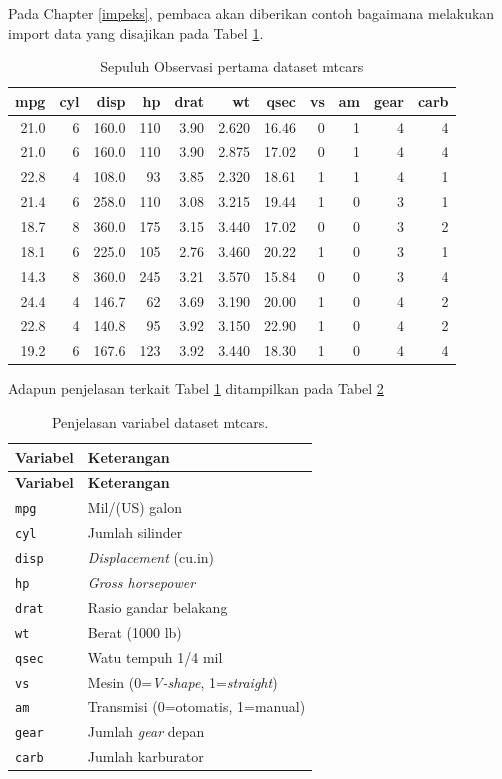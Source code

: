 \documentclass[12pt,]{krantz}
\begin{document}
Pada Chapter \ref{impeks}, pembaca akan diberikan contoh bagaimana melakukan import data yang disajikan pada Tabel \ref{tab:mtcars}.

\begin{table}

\caption{\label{tab:mtcars}Sepuluh Observasi pertama dataset mtcars}
\centering
\begin{tabular}[t]{r|r|r|r|r|r|r|r|r|r|r}
\hline
mpg & cyl & disp & hp & drat & wt & qsec & vs & am & gear & carb\\
\hline
21.0 & 6 & 160.0 & 110 & 3.90 & 2.620 & 16.46 & 0 & 1 & 4 & 4\\
\hline
21.0 & 6 & 160.0 & 110 & 3.90 & 2.875 & 17.02 & 0 & 1 & 4 & 4\\
\hline
22.8 & 4 & 108.0 & 93 & 3.85 & 2.320 & 18.61 & 1 & 1 & 4 & 1\\
\hline
21.4 & 6 & 258.0 & 110 & 3.08 & 3.215 & 19.44 & 1 & 0 & 3 & 1\\
\hline
18.7 & 8 & 360.0 & 175 & 3.15 & 3.440 & 17.02 & 0 & 0 & 3 & 2\\
\hline
18.1 & 6 & 225.0 & 105 & 2.76 & 3.460 & 20.22 & 1 & 0 & 3 & 1\\
\hline
14.3 & 8 & 360.0 & 245 & 3.21 & 3.570 & 15.84 & 0 & 0 & 3 & 4\\
\hline
24.4 & 4 & 146.7 & 62 & 3.69 & 3.190 & 20.00 & 1 & 0 & 4 & 2\\
\hline
22.8 & 4 & 140.8 & 95 & 3.92 & 3.150 & 22.90 & 1 & 0 & 4 & 2\\
\hline
19.2 & 6 & 167.6 & 123 & 3.92 & 3.440 & 18.30 & 1 & 0 & 4 & 4\\
\hline
\end{tabular}
\end{table}

Adapun penjelasan terkait Tabel \ref{tab:mtcars} ditampilkan pada Tabel \ref{tab:mtcars2}

\begin{longtable}[]{@{}ll@{}}
\caption{\label{tab:mtcars2} Penjelasan variabel dataset mtcars.}\tabularnewline
\toprule
\textbf{Variabel} & \textbf{Keterangan}\tabularnewline
\midrule
\endfirsthead
\toprule
\textbf{Variabel} & \textbf{Keterangan}\tabularnewline
\midrule
\endhead
\texttt{mpg} & Mil/(US) galon\tabularnewline
\texttt{cyl} & Jumlah silinder\tabularnewline
\texttt{disp} & \emph{Displacement} (cu.in)\tabularnewline
\texttt{hp} & \emph{Gross horsepower}\tabularnewline
\texttt{drat} & Rasio gandar belakang\tabularnewline
\texttt{wt} & Berat (1000 lb)\tabularnewline
\texttt{qsec} & Watu tempuh 1/4 mil\tabularnewline
\texttt{vs} & Mesin (0=\emph{V-shape}, 1=\emph{straight})\tabularnewline
\texttt{am} & Transmisi (0=otomatis, 1=manual)\tabularnewline
\texttt{gear} & Jumlah \emph{gear} depan\tabularnewline
\texttt{carb} & Jumlah karburator\tabularnewline
\bottomrule
\end{longtable}
\end{document}
